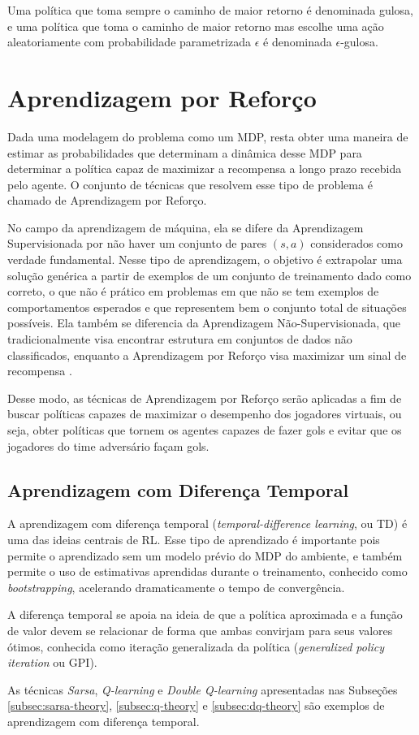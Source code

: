Uma política que toma sempre o caminho de maior retorno é denominada gulosa, e uma política que toma o caminho de maior retorno mas escolhe uma ação aleatoriamente com probabilidade parametrizada $\epsilon$ é denominada $\epsilon$-gulosa.


\section{Aprendizagem por Reforço}

Dada uma modelagem do problema como um MDP, resta obter uma maneira de estimar as probabilidades que determinam a dinâmica desse MDP para determinar a política capaz de maximizar a recompensa a longo prazo recebida pelo agente. O conjunto de técnicas que resolvem esse tipo de problema é chamado de Aprendizagem por Reforço.

No campo da aprendizagem de máquina, ela se difere da Aprendizagem Supervisionada por não haver um conjunto de pares $(s, a)$ considerados como verdade fundamental.
Nesse tipo de aprendizagem, o objetivo é extrapolar uma solução genérica a partir de exemplos de um conjunto de treinamento dado como correto, o que não é prático em problemas em que não se tem exemplos de comportamentos esperados e que representem bem o conjunto total de situações possíveis.
Ela também se diferencia da Aprendizagem Não-Supervisionada, que tradicionalmente visa encontrar estrutura em conjuntos de dados não classificados, enquanto a Aprendizagem por Reforço visa maximizar um sinal de recompensa \cite{sutton2018reinforcement}.

Desse modo, as técnicas de Aprendizagem por Reforço serão aplicadas a fim de buscar políticas capazes de maximizar o desempenho dos jogadores virtuais, ou seja, obter políticas que tornem os agentes capazes de fazer gols e evitar que os jogadores do time adversário façam gols.

\subsection{Aprendizagem com Diferença Temporal}
\par A aprendizagem com diferença temporal (\textit{temporal-difference learning}, ou TD) é uma das ideias centrais de RL. \cite{sutton2018reinforcement} Esse tipo de aprendizado é importante pois permite o aprendizado sem um modelo prévio do MDP do ambiente, e também permite o uso de estimativas aprendidas durante o treinamento, conhecido como \textit{bootstrapping}, acelerando dramaticamente o tempo de convergência. 
\par A diferença temporal se apoia na ideia de que a política aproximada e a função de valor devem se relacionar de forma que ambas convirjam para seus valores ótimos, conhecida como iteração generalizada da política (\textit{generalized policy iteration} ou GPI). \cite{sutton2018reinforcement} 
\par As técnicas \textit{Sarsa}, \textit{Q-learning} e \textit{Double Q-learning} apresentadas nas Subseções \ref{subsec:sarsa-theory}, \ref{subsec:q-theory} e \ref{subsec:dq-theory} são exemplos de aprendizagem com diferença temporal.

